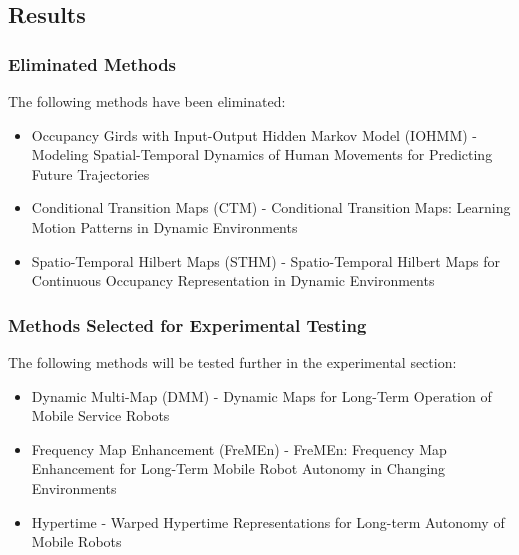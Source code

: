   \subsection{ Results }
  \subsubsection{ Eliminated Methods }
  The following methods have been eliminated:
  \begin{itemize}
    \item Occupancy Girds with Input-Output Hidden Markov Model (IOHMM) - Modeling Spatial-Temporal Dynamics of Human Movements for Predicting Future Trajectories \cite{Wang2015}
    \item Conditional Transition Maps (CTM) - Conditional Transition Maps: Learning Motion Patterns in Dynamic Environments \cite{Kucner2013}
    \item Spatio-Temporal Hilbert Maps (STHM) - Spatio-Temporal Hilbert Maps for Continuous Occupancy Representation in Dynamic Environments \cite{Senanayake2016}
  \end{itemize}

  \subsubsection{ Methods Selected for Experimental Testing }
  The following methods will be tested further in the experimental section:
  \begin{itemize}
    \item Dynamic Multi-Map (DMM) - Dynamic Maps for Long-Term Operation of Mobile Service Robots \cite{biber2005}
    \item Frequency Map Enhancement (FreMEn) - FreMEn: Frequency Map Enhancement for Long-Term Mobile Robot Autonomy in Changing Environments \cite{Krajnik2015}
    \item Hypertime - Warped Hypertime Representations for Long-term Autonomy of Mobile Robots \cite{Kranjik2018}
  \end{itemize}


